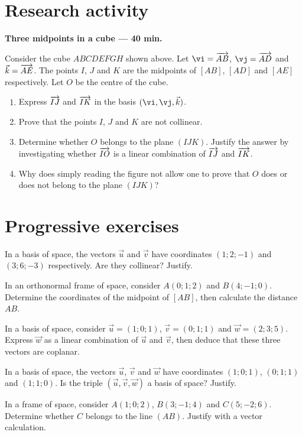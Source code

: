 \section{Research activity}\textbf{Three midpoints in a cube --- 40 min.}\par Consider the cube $ABCDEFGH$ shown above. Let $\vi=\vect{AB}$, $\vj=\vect{AD}$ and $\vec k=\overrightarrow{AE}$. The points $I$, $J$ and $K$ are the midpoints of $[AB]$, $[AD]$ and $[AE]$ respectively. Let $O$ be the centre of the cube.
\begin{enumerate}\item Express $\overrightarrow{IJ}$ and $\overrightarrow{IK}$ in the basis $(\vi,\vj,\vec k)$.
\item Prove that the points $I$, $J$ and $K$ are not collinear.
\item Determine whether $O$ belongs to the plane $(IJK)$. Justify the answer by investigating whether $\overrightarrow{IO}$ is a linear combination of $\overrightarrow{IJ}$ and $\overrightarrow{IK}$.
\item Why does simply reading the figure not allow one to prove that $O$ does or does not belong to the plane $(IJK)$?\end{enumerate}

\section{Progressive exercises}

In a basis of space, the vectors $\vec u$ and $\vec v$ have coordinates $(1;2;-1)$ and $(3;6;-3)$ respectively. Are they collinear? Justify.

In an orthonormal frame of space, consider $A(0;1;2)$ and $B(4;-1;0)$. Determine the coordinates of the midpoint of $[AB]$, then calculate the distance $AB$.

In a basis of space, consider $\vec u=(1;0;1)$, $\vec v=(0;1;1)$ and $\vec w=(2;3;5)$. Express $\vec w$ as a linear combination of $\vec u$ and $\vec v$, then deduce that these three vectors are coplanar.

In a basis of space, the vectors $\vec u$, $\vec v$ and $\vec w$ have coordinates $(1;0;1)$, $(0;1;1)$ and $(1;1;0)$. Is the triple $(\vec u,\vec v,\vec w)$ a basis of space? Justify.

In a frame of space, consider $A(1;0;2)$, $B(3;-1;4)$ and $C(5;-2;6)$. Determine whether $C$ belongs to the line $(AB)$. Justify with a vector calculation.


